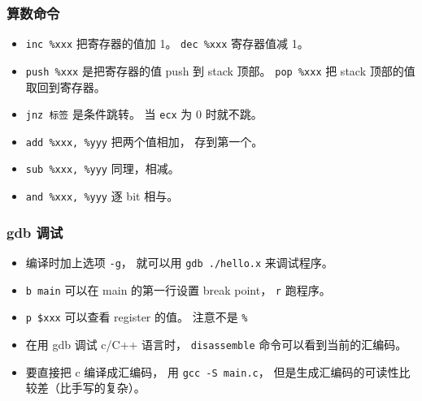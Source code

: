 \subsubsection{算数命令}
\begin{itemize}
\item \verb|inc %xxx| 把寄存器的值加 1。 \verb|dec %xxx| 寄存器值减 1。
\item \verb|push %xxx| 是把寄存器的值 push 到 stack 顶部。 \verb|pop %xxx| 把 stack 顶部的值取回到寄存器。
\item \verb|jnz 标签| 是条件跳转。 当 \verb|ecx| 为 0 时就不跳。
\item \verb|add %xxx, %yyy| 把两个值相加， 存到第一个。
\item \verb|sub %xxx, %yyy| 同理，相减。
\item \verb|and %xxx, %yyy| 逐 bit 相与。
\end{itemize}

\subsubsection{gdb 调试}
\begin{itemize}
\item 编译时加上选项 \verb|-g|， 就可以用 \verb|gdb ./hello.x| 来调试程序。
\item \verb|b main| 可以在 main 的第一行设置 break point， \verb|r| 跑程序。
\item \verb|p $xxx| 可以查看 register 的值。 注意不是 \verb|%|
\item 在用 gdb 调试 c/C++ 语言时， \verb|disassemble| 命令可以看到当前的汇编码。
\item 要直接把 c 编译成汇编码， 用 \verb|gcc -S main.c|， 但是生成汇编码的可读性比较差（比手写的复杂）。
\end{itemize}

